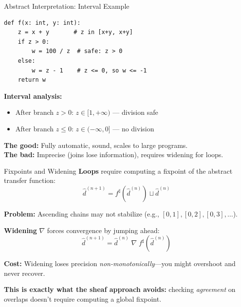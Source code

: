 \documentclass[aspectratio=169,10pt]{beamer}
\begin{document}
\begin{frame}[fragile]{Abstract Interpretation: Interval Example}
\begin{lstlisting}
def f(x: int, y: int):
    z = x + y       # z in [x+y, x+y]
    if z > 0:
        w = 100 / z  # safe: z > 0
    else:
        w = z - 1    # z <= 0, so w <= -1
    return w
\end{lstlisting}

\textbf{Interval analysis:}
\begin{itemize}
  \item After branch $z > 0$: $z \in [1, +\infty)$ --- division safe
  \item After branch $z \leq 0$: $z \in (-\infty, 0]$ --- no division
\end{itemize}

\vspace{0.3em}
\textbf{The good:} Fully automatic, sound, scales to large programs.\\
\textbf{The bad:} Imprecise (joins lose information), requires widening for loops.
\end{frame}

\begin{frame}{Fixpoints and Widening}
\textbf{Loops} require computing a fixpoint of the abstract transfer function:
\[
\hat{d}^{(n+1)} = f^\sharp(\hat{d}^{(n)}) \sqcup \hat{d}^{(n)}
\]

\textbf{Problem:} Ascending chains may not stabilize (e.g., $[0,1], [0,2], [0,3], \ldots$).

\vspace{0.3em}
\textbf{Widening} $\nabla$ forces convergence by jumping ahead:
\[
\hat{d}^{(n+1)} = \hat{d}^{(n)} \;\nabla\; f^\sharp(\hat{d}^{(n)})
\]

\textbf{Cost:} Widening loses precision \emph{non-monotonically}---you might overshoot and never recover.

\vspace{0.5em}
\textcolor{honest}{\textbf{This is exactly what the sheaf approach avoids:}} checking \emph{agreement} on overlaps doesn't require computing a global fixpoint.
\end{frame}
\end{document}
